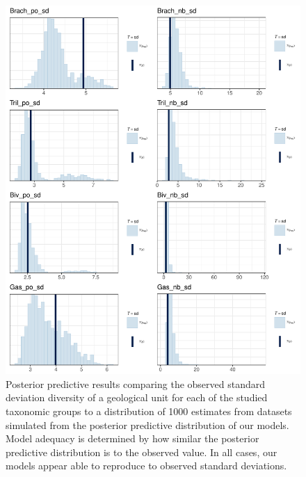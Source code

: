 \documentclass[12pt,letterpaper]{article}
\begin{document}
\begin{figure}[ht]
  \centering
  \includegraphics[width=\textwidth,height=0.5\textheight,keepaspectratio=true]{figure/ppc_sd}
  \caption{Posterior predictive results comparing the observed standard deviation diversity of a geological unit for each of the studied taxonomic groups to a distribution of 1000 estimates from datasets simulated from the posterior predictive distribution of our models. Model adequacy is determined by how similar the posterior predictive distribution is to the observed value. In all cases, our models appear able to reproduce to observed standard deviations.}
  \label{fig:ppc_sd}
\end{figure}
\end{document}
